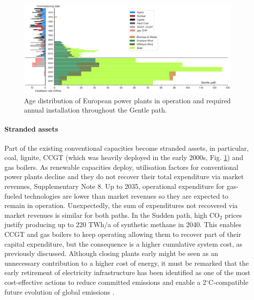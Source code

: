 \documentclass[5p]{elsarticle} %
\begin{document}
\begin{figure}[!h]
\centering
\includegraphics[width=\textwidth]{../figures/age_distribution_Base_Gentle.png}
\caption{Age distribution of European power plants in operation \cite{powerplantmatching, IRENA_2019} and required annual installation throughout the Gentle path.} \label{fig_age_distribution} 
\end{figure}

\paragraph{\textbf{Stranded assets}} Part of the existing conventional capacities become stranded assets, in particular, coal, lignite, CCGT (which was heavily deployed in the early 2000s, Fig. \ref{fig_age_distribution}) and gas boilers. As renewable capacities deploy, utilisation factors for conventional power plants decline and they do not recover their total expenditure via market revenues, Supplementary Note 8. Up to 2035, operational expenditure for gas-fueled technologies are lower than market revenues so they are expected to remain in operation. Unexpectedly, the sum of expenditures not recovered via market revenues is similar for both paths. In the Sudden path, high CO$_2$ prices justify producing up to 220 TWh/a of synthetic methane in 2040. This enables CCGT and gas boilers to keep operating allowing them to recover part of their capital expenditure, but the consequence is a higher cumulative system cost, as previously discussed. Although closing plants early might be seen as an unnecessary contribution to a higher cost of energy, it must be remarked that the early retirement of electricity infrastructure has been identified as one of the most cost-effective actions to reduce committed emissions and enable a 2$^{\circ}$C-compatible future evolution of global emissions \cite{Tong_2019}.
\end{document}
